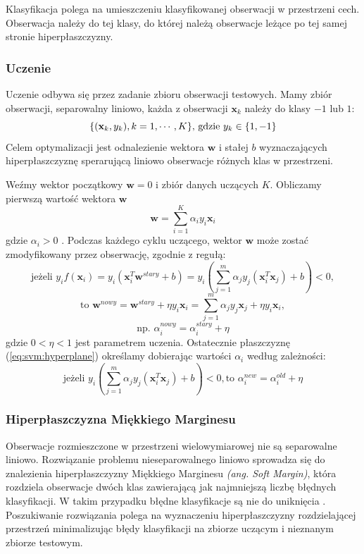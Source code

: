 \documentclass[a4paper,12pt,twoside,openany]{report}
\newcommand{\ang}[1]{\textit{(ang. #1)}}
\newcommand{\Eq}[1]{(\ref{#1})}
\renewcommand{\vec}[1]{\bm{#1}}
\begin{document}
Klasyfikacja polega na umieszczeniu klasyfikowanej obserwacji w przestrzeni cech.
Obserwacja należy do tej klasy, do której należą obserwacje leżące po tej samej stronie hiperpłaszczyzny.
\subsubsection{Uczenie}
Uczenie odbywa się przez zadanie zbioru obserwacji testowych. 
Mamy zbiór obserwacji, separowalny liniowo, każda z obserwacji $\vec{x}_k$ należy do klasy $-1$ lub $1$:
\begin{equation}
	\{ ({\bf x}_k, y_k), k=1,\cdots,K \} \mbox{, gdzie } y_k \in \{1,-1\}
\end{equation}
Celem optymalizacji jest odnalezienie wektora $\vec{w}$ i stałej $b$ wyznaczających hiperpłaszczyznę
sperarującą liniowo obserwacje różnych klas w przestrzeni. 

Weźmy wektor początkowy $\vec{w} = 0$ i zbiór danych uczących $K$.
Obliczamy pierwszą wartość wektora $\vec{w}$
\begin{equation}\label{eq:svm:hyperplane}
	{\vec{w}}=\sum_{i=1}^K \alpha_i y_i {\vec{x}}_i
\end{equation}
gdzie $\alpha_i>0$ \cite{Mittal2016}.
Podczas każdego cyklu uczącego, wektor $\vec{w}$ może zostać zmodyfikowany przez obserwację, 
zgodnie z regułą:
\begin{equation}
	\mbox{jeżeli } y_i f({\vec{x}}_i)=y_i ({\vec{x}}_i^T{\vec{w}}^{stary}+b)
	=y_i\left(\sum_{j=1}^m \alpha_j y_j({\vec{x}}_i^T{\vec{x}}_j)+b\right)<0,
\end{equation}
\begin{equation}
	\mbox{to } {\vec{w}}^{nowy}={\vec{w}}^{stary}+\eta y_i {\vec{x}}_i
	=\sum_{j=1}^{m} \alpha_j y_j\vec{x}_j +\eta y_i {\vec{x}}_i,
\end{equation}
\begin{equation}
	\mbox{np. }
	\alpha_i^{nowy}=\alpha_i^{stary}+\eta
\end{equation}
gdzie $0 < \eta < 1$ jest parametrem uczenia.
Ostatecznie płaszczyznę \Eq{eq:svm:hyperplane} określamy dobierając wartości $\alpha_i$ według zależności: 
\begin{equation}
	\mbox{jeżeli } y_i\left(\sum_{j=1}^m \alpha_j y_j({\vec{x}}_i^T\vec{x}_j)+b\right)<0,
	\mbox{to } \alpha_i^{new}=\alpha_i^{old}+\eta 
\end{equation}

\subsubsection{Hiperpłaszczyzna Miękkiego Marginesu}
Obserwacje rozmieszczone w przestrzeni wielowymiarowej nie są separowalne liniowo. 
Rozwiązanie problemu nieseparowalnego liniowo sprowadza się do znalezienia hiperpłaszczyzny Miękkiego Marginesu \ang{Soft Margin}, 
która rozdziela obserwacje dwóch klas zawierającą jak najmniejszą liczbę błędnych klasyfikacji.
W takim przypadku błędne klasyfikacje są nie do uniknięcia \cite{Dellepiane2015}.
Poszukiwanie rozwiązania polega na wyznaczeniu hiperpłaszczyzny rozdzielającej przestrzeń 
minimalizując błędy klasyfikacji na zbiorze uczącym i nieznanym zbiorze testowym.
\end{document}
